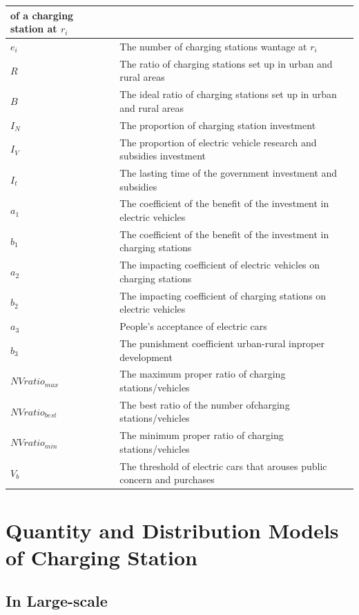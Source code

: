 \documentclass{mcmthesis}
\begin{document}
\begin{tabular}{l|l}
		of a charging station at $r_i$  \bigstrut\\
		\hline
		$e_i$  & The number of charging stations wantage at $r_i$ \bigstrut\\
		\hline
		$R$    & The ratio of charging stations set up in urban and rural areas \bigstrut\\
		\hline
		$B$     & The ideal ratio of charging stations set up in urban and rural areas \bigstrut\\
		\hline
		$I_N$  & The proportion of charging station investment \bigstrut\\
		\hline
		$I_V$  & The proportion of electric vehicle research and subsidies investment \bigstrut\\
		\hline
		$I_t$  & The lasting time of the government investment and subsidies \bigstrut\\
		\hline
		$a_1$  & The coefficient of the benefit of the investment in electric vehicles \bigstrut\\
		\hline
		$b_1$  & The coefficient of the benefit of the investment in charging stations \bigstrut\\
		\hline
		$a_2$  & The impacting coefficient of  electric vehicles on charging stations \bigstrut\\
		\hline
		$b_2$  & The impacting coefficient of charging stations on electric vehicles \bigstrut\\
		\hline
		$a_3$  & People's acceptance of electric cars \bigstrut\\
		\hline
		$b_3$  & The punishment coefficient urban-rural inproper development \bigstrut\\
		\hline
		$NVratio_{max}$ & The maximum proper ratio of charging stations/vehicles \bigstrut\\
		\hline
		$NVratio_{best}$ & The best ratio of the number ofcharging stations/vehicles \bigstrut\\
		\hline
		$NVratio_{min}$ & The minimum proper ratio of charging stations/vehicles \bigstrut\\
		\hline
		$V_b$  & The threshold of electric cars that
		arouses public concern and purchases \bigstrut\\
		\hline
	\end{tabular}%
	\label{tab:addlabel}%
\section{Quantity and Distribution Models of Charging Station}
	\subsection{In Large-scale}
\end{document}

